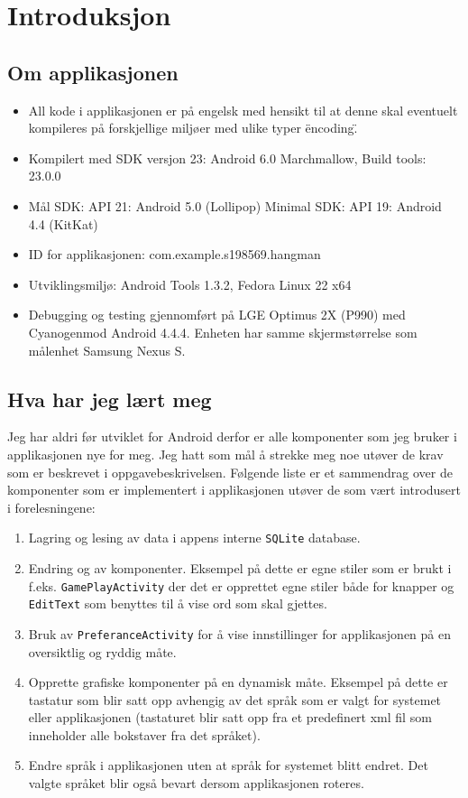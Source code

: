 \chapter{Introduksjon}


\section{Om applikasjonen}
\begin{itemize}
\item All kode i applikasjonen er på engelsk med hensikt til at denne skal eventuelt kompileres på forskjellige miljøer med ulike typer \"encoding\". 
\item Kompilert med SDK versjon 23: Android 6.0 Marchmallow, Build tools: 23.0.0
\item Mål SDK: API 21: Android 5.0 (Lollipop) Minimal SDK: API 19: Android 4.4 (KitKat)
\item ID for applikasjonen: com.example.s198569.hangman
\item Utviklingsmiljø: Android Tools 1.3.2, Fedora Linux 22 x64
\item Debugging og testing gjennomført på LGE Optimus 2X (P990) med Cyanogenmod Android 4.4.4. Enheten har samme skjermstørrelse som målenhet Samsung Nexus S.
\end{itemize}


\section{Hva har jeg lært meg}
Jeg har aldri før utviklet for Android derfor er alle komponenter som jeg bruker i applikasjonen nye for meg. Jeg hatt som mål å strekke meg noe utøver de krav som er beskrevet i oppgavebeskrivelsen. Følgende liste er et sammendrag over de komponenter som er implementert i applikasjonen utøver de som vært introdusert i forelesningene:
\begin{enumerate}
\item Lagring og lesing av data i appens interne \texttt{SQLite} database.
\item Endring og  av komponenter. Eksempel på dette er egne stiler som er brukt i f.eks. \texttt{GamePlayActivity} der det er opprettet egne stiler både for knapper og \texttt{EditText} som benyttes til å vise ord som skal gjettes.
\item Bruk av \texttt{PreferanceActivity} for å vise innstillinger for applikasjonen på en oversiktlig og ryddig måte. 
\item Opprette grafiske komponenter på en dynamisk måte. Eksempel på dette er tastatur som blir satt opp avhengig av det språk som er valgt for systemet eller applikasjonen (tastaturet blir satt opp fra et predefinert xml fil som inneholder alle bokstaver fra det språket). 
\item Endre språk i applikasjonen uten at språk for systemet blitt endret. Det valgte språket blir også bevart dersom applikasjonen roteres. 
\end{enumerate}



